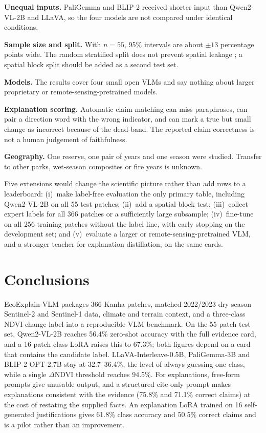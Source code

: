 \documentclass[11pt]{article}
\begin{document}
\textbf{Unequal inputs.} PaliGemma and BLIP-2 received shorter input
than Qwen2-VL-2B and LLaVA, so the four models are not compared under
identical conditions.

\textbf{Sample size and split.} With $n = 55$, 95\% intervals are about
$\pm 13$ percentage points wide. The random stratified split does not
prevent spatial leakage \citep{ploton2020}; a spatial block split should
be added as a second test set.

\textbf{Models.} The results cover four small open VLMs and say nothing
about larger proprietary or remote-sensing-pretrained models.

\textbf{Explanation scoring.} Automatic claim matching can miss
paraphrases, can pair a direction word with the wrong indicator, and can
mark a true but small change as incorrect because of the dead-band. The
reported claim correctness is not a human judgement of faithfulness.

\textbf{Geography.} One reserve, one pair of years and one season were
studied. Transfer to other parks, wet-season composites or fire years is
unknown.

Five extensions would change the scientific picture rather than add
rows to a leaderboard: (i)~make label-free evaluation the only primary
table, including Qwen2-VL-2B on all 55 test patches; (ii)~add a spatial
block test; (iii)~collect expert labels for all 366 patches or a
sufficiently large subsample; (iv)~fine-tune on all 256 training
patches without the label line, with early stopping on the development
set; and (v)~evaluate a larger or remote-sensing-pretrained VLM, and a
stronger teacher for explanation distillation, on the same cards.


\section{Conclusions}

EcoExplain-VLM packages 366 Kanha patches, matched 2022/2023 dry-season
Sentinel-2 and Sentinel-1 data, climate and terrain context, and a
three-class NDVI-change label into a reproducible VLM benchmark. On the
55-patch test set, Qwen2-VL-2B reaches 56.4\% zero-shot accuracy with
the full evidence card, and a 16-patch class LoRA raises this to
67.3\%; both figures depend on a card that contains the candidate label.
LLaVA-Interleave-0.5B, PaliGemma-3B and BLIP-2 OPT-2.7B stay at
32.7--36.4\%, the level of always guessing one class, while a single
$\Delta$NDVI threshold reaches 94.5\%. For explanations, free-form
prompts give unusable output, and a structured cite-only prompt makes
explanations consistent with the evidence (75.8\% and 71.1\% correct
claims) at the cost of restating the supplied facts. An explanation LoRA
trained on 16 self-generated justifications gives 61.8\% class accuracy
and 50.5\% correct claims and is a pilot rather than an improvement.
\end{document}
